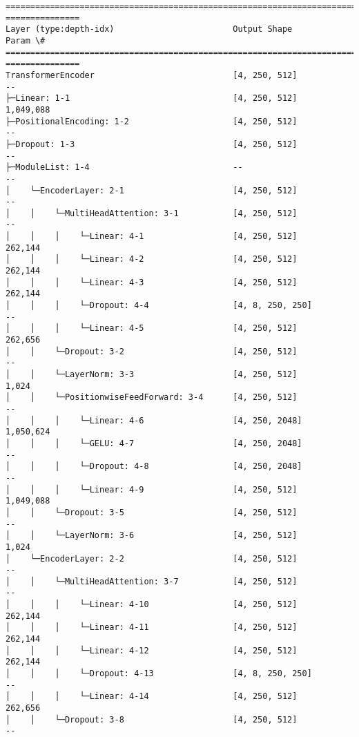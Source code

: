 \documentclass[12pt]{article}
\begin{document}
    \begin{Verbatim}[commandchars=\\\{\}]
================================================================================
===============
Layer (type:depth-idx)                        Output Shape              Param \#
================================================================================
===============
TransformerEncoder                            [4, 250, 512]             --
├─Linear: 1-1                                 [4, 250, 512]
1,049,088
├─PositionalEncoding: 1-2                     [4, 250, 512]             --
├─Dropout: 1-3                                [4, 250, 512]             --
├─ModuleList: 1-4                             --                        --
│    └─EncoderLayer: 2-1                      [4, 250, 512]             --
│    │    └─MultiHeadAttention: 3-1           [4, 250, 512]             --
│    │    │    └─Linear: 4-1                  [4, 250, 512]             262,144
│    │    │    └─Linear: 4-2                  [4, 250, 512]             262,144
│    │    │    └─Linear: 4-3                  [4, 250, 512]             262,144
│    │    │    └─Dropout: 4-4                 [4, 8, 250, 250]          --
│    │    │    └─Linear: 4-5                  [4, 250, 512]             262,656
│    │    └─Dropout: 3-2                      [4, 250, 512]             --
│    │    └─LayerNorm: 3-3                    [4, 250, 512]             1,024
│    │    └─PositionwiseFeedForward: 3-4      [4, 250, 512]             --
│    │    │    └─Linear: 4-6                  [4, 250, 2048]
1,050,624
│    │    │    └─GELU: 4-7                    [4, 250, 2048]            --
│    │    │    └─Dropout: 4-8                 [4, 250, 2048]            --
│    │    │    └─Linear: 4-9                  [4, 250, 512]
1,049,088
│    │    └─Dropout: 3-5                      [4, 250, 512]             --
│    │    └─LayerNorm: 3-6                    [4, 250, 512]             1,024
│    └─EncoderLayer: 2-2                      [4, 250, 512]             --
│    │    └─MultiHeadAttention: 3-7           [4, 250, 512]             --
│    │    │    └─Linear: 4-10                 [4, 250, 512]             262,144
│    │    │    └─Linear: 4-11                 [4, 250, 512]             262,144
│    │    │    └─Linear: 4-12                 [4, 250, 512]             262,144
│    │    │    └─Dropout: 4-13                [4, 8, 250, 250]          --
│    │    │    └─Linear: 4-14                 [4, 250, 512]             262,656
│    │    └─Dropout: 3-8                      [4, 250, 512]             --

\end{Verbatim}
\end{document}
